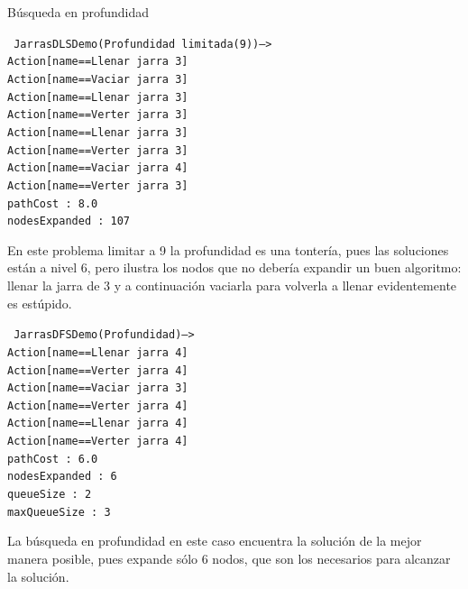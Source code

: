 \documentclass[11pt, a4paper, spanish, openright, twoside]{book}
\begin{document}
\begin{section}{Búsqueda en profundidad}

\texttt{
	JarrasDLSDemo(Profundidad limitada(9))-->	\\
	Action[name==Llenar jarra 3]		\\
	Action[name==Vaciar jarra 3]		\\
	Action[name==Llenar jarra 3]		\\
	Action[name==Verter jarra 3]		\\
	Action[name==Llenar jarra 3]		\\
	Action[name==Verter jarra 3]		\\
	Action[name==Vaciar jarra 4]		\\
	Action[name==Verter jarra 3]		\\
	pathCost : 8.0					\\
	nodesExpanded : 107			\\
}

En este problema limitar a 9 la profundidad es una tontería, pues las soluciones están a nivel 6, pero ilustra los nodos que no debería expandir 
un buen algoritmo: llenar la jarra de 3 y a continuación vaciarla para volverla a llenar evidentemente es estúpido.

\texttt{
	JarrasDFSDemo(Profundidad)-->	\\
	Action[name==Llenar jarra 4]		\\
	Action[name==Verter jarra 4]		\\
	Action[name==Vaciar jarra 3]		\\
	Action[name==Verter jarra 4]		\\
	Action[name==Llenar jarra 4]		\\
	Action[name==Verter jarra 4]		\\
	pathCost : 6.0					\\
	nodesExpanded : 6				\\
	queueSize : 2					\\
	maxQueueSize : 3				
}

La búsqueda en profundidad en este caso encuentra la solución de la mejor manera posible, pues expande sólo 6 nodos, que son los necesarios para alcanzar la solución.

\end{section}
\end{document}
